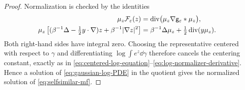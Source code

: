 \documentclass[11pt,reqno]{amsart}
\numberwithin{equation}{section}
\theoremstyle{plain}
\theoremstyle{remark}
\DeclareMathOperator{\diver}{div}
\begin{document}
\begin{proof}
Normalization is checked by the identities
\begin{align}
 \mu_z\mathcal F_\varepsilon(z)
 &=\diver\bigl(\mu_z\nabla\g_\varepsilon*\mu_z\bigr),
 \label{eq:gaussian-forcing-density-identity}\\
 \mu_z\left[(\beta^{-1}\Delta-\tfrac12y\cdot\nabla)z+
             \beta^{-1}|\nabla z|^2\right]
 &=\beta^{-1}\Delta\mu_z+\tfrac12\diver(y\mu_z).
 \label{eq:gaussian-OU-density-identity}
\end{align}
Both right-hand sides have integral zero. Choosing the representative centered with respect to $\gamma$ and differentiating $\log\int e^z\dd\gamma$ therefore cancels the centering constant, exactly as in \eqref{eq:centered-log-equation}--\eqref{eq:log-normalizer-derivative}. Hence a solution of \eqref{eq:gaussian-log-PDE} in the quotient gives the normalized solution of \eqref{eq:selfsimilar-mf}.


\end{proof}
\end{document}
